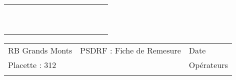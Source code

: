 \documentclass[a4paper, landscape]{article}\usepackage[]{graphicx}\usepackage[]{color}
\begin{document}
{\begin{tabular}{|p{1cm}|p{2cm}|p{1.6cm}|p{1.6cm}|p{1.6cm}|p{1.6cm}|p{1.5cm}|p{1.5cm}|p{1.5cm}|p{1.5cm}|p{1.5cm}|p{7.5cm}|p{5cm}|}
   \hline
 &  &  &  &  &  &  &  &  &  &  &  &  \\ 
   \rowcolor[gray]{0.95} \hline
 &  &  &  &  &  &  &  &  &  &  &  &  \\ 
   \hline
 &  &  &  &  &  &  &  &  &  &  &  &  \\ 
   \rowcolor[gray]{0.95} \hline
 &  &  &  &  &  &  &  &  &  &  &  &  \\ 
   \hline
 &  &  &  &  &  &  &  &  &  &  &  &  \\ 
   \rowcolor[gray]{0.95} \hline
 &  &  &  &  &  &  &  &  &  &  &  &  \\ 
   \hline
 &  &  &  &  &  &  &  &  &  &  &  &  \\ 
   \rowcolor[gray]{0.95} \hline
 &  &  &  &  &  &  &  &  &  &  &  &  \\ 
   \hline
 &  &  &  &  &  &  &  &  &  &  &  &  \\ 
   \rowcolor[gray]{0.95} \hline
 &  &  &  &  &  &  &  &  &  &  &  &  \\ 
   \hline
\end{tabular}
}

\begin{tabular}{p{10cm}p{10cm}p{8cm}}
  RB Grands Monts & PSDRF : Fiche de Remesure & Date \\ 
  Placette : 312 &  & Opérateurs \\ 
   &  &  \\ 
  \end{tabular}
\end{document}
